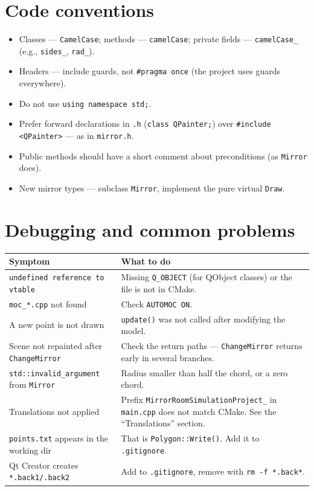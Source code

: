 \documentclass[a4paper,11pt]{article}
\newcommand{\file}[1]{\texttt{#1}}
\newcommand{\code}[1]{\texttt{#1}}
\begin{document}
\section{Code conventions}

\begin{itemize}[leftmargin=*]
    \item Classes — \code{CamelCase}; methods — \code{camelCase};
          private fields — \code{camelCase\_} (e.g., \code{sides\_},
          \code{rad\_}).
    \item Headers — include guards, not \code{\#pragma once}
          (the project uses guards everywhere).
    \item Do not use \code{using namespace std;}.
    \item Prefer forward declarations in \file{.h} (\code{class QPainter;})
          over \code{\#include <QPainter>} — as in \file{mirror.h}.
    \item Public methods should have a short comment about
          preconditions (as \code{Mirror} does).
    \item New mirror types — subclass \code{Mirror}, implement the pure
          virtual \code{Draw}.
\end{itemize}

\section{Debugging and common problems}

\begin{longtable}{@{}p{6.3cm}p{8.2cm}@{}}
\toprule
\textbf{Symptom} & \textbf{What to do} \\ \midrule
\endhead
\code{undefined reference to vtable} &
Missing \code{Q\_OBJECT} (for QObject classes) or the file is not in
CMake. \\
\addlinespace
\code{moc\_*.cpp} not found &
Check \code{AUTOMOC ON}. \\
\addlinespace
A new point is not drawn &
\code{update()} was not called after modifying the model. \\
\addlinespace
Scene not repainted after \code{ChangeMirror} &
Check the return paths — \code{ChangeMirror} returns early in several
branches. \\
\addlinespace
\code{std::invalid\_argument} from \code{Mirror} &
Radius smaller than half the chord, or a zero chord. \\
\addlinespace
Translations not applied &
Prefix \code{MirrorRoomSimulationProject\_} in \file{main.cpp}
does not match CMake. See the ``Translations'' section. \\
\addlinespace
\file{points.txt} appears in the working dir &
That is \code{Polygon::Write()}. Add it to \code{.gitignore}. \\
\addlinespace
Qt Creator creates \file{*.back1/.back2} &
Add to \code{.gitignore}, remove with \code{rm -f *.back*}. \\
\bottomrule
\end{longtable}
\end{document}
